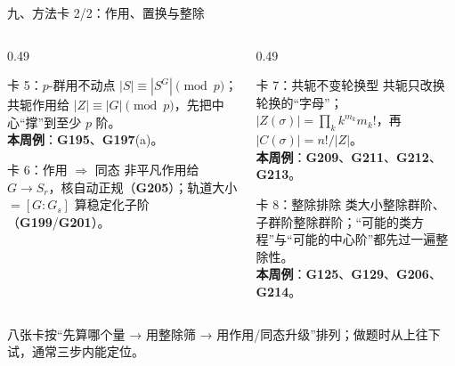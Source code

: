\documentclass[aspectratio=169,10pt,fontset=none]{ctexbeamer}
\newcommand{\ex}[1]{\textcolor{accent}{\footnotesize\bfseries #1}}
\newcommand{\key}[1]{\textcolor{ink}{\bfseries #1}}
\begin{document}
\begin{frame}[t]{九、方法卡 2/2：作用、置换与整除}
  \begin{columns}[T,onlytextwidth]
    \begin{column}{0.49\textwidth}
      \begin{block}{\footnotesize 卡 5：$p$-群用不动点}
        \scriptsize
        $|S|\equiv|S^G|\pmod p$；共轭作用给 $|Z|\equiv|G|\pmod p$，先把中心“撑”到至少 $p$ 阶。\\
        \key{本周例}：\ex{G195}、\ex{G197}(a)。
      \end{block}
      \begin{block}{\footnotesize 卡 6：作用 $\Rightarrow$ 同态}
        \scriptsize
        非平凡作用给 $G\to S_r$，核自动正规（\ex{G205}）；轨道大小 $=[G:G_s]$ 算稳定化子阶（\ex{G199}/\ex{G201}）。
      \end{block}
    \end{column}
    \begin{column}{0.49\textwidth}
      \begin{block}{\footnotesize 卡 7：共轭不变轮换型}
        \scriptsize
        共轭只改换轮换的“字母”；$|Z(\sigma)|=\prod_k k^{m_k}m_k!$，再 $|C(\sigma)|=n!/|Z|$。\\
        \key{本周例}：\ex{G209}、\ex{G211}、\ex{G212}、\ex{G213}。
      \end{block}
      \begin{block}{\footnotesize 卡 8：整除排除}
        \scriptsize
        类大小整除群阶、子群阶整除群阶；“可能的类方程”与“可能的中心阶”都先过一遍整除性。\\
        \key{本周例}：\ex{G125}、\ex{G129}、\ex{G206}、\ex{G214}。
      \end{block}
    \end{column}
  \end{columns}
  \vspace{0.2em}
  {\scriptsize\color{ink!70} 八张卡按“先算哪个量 → 用整除筛 → 用作用/同态升级”排列；做题时从上往下试，通常三步内能定位。}
\end{frame}
\end{document}
